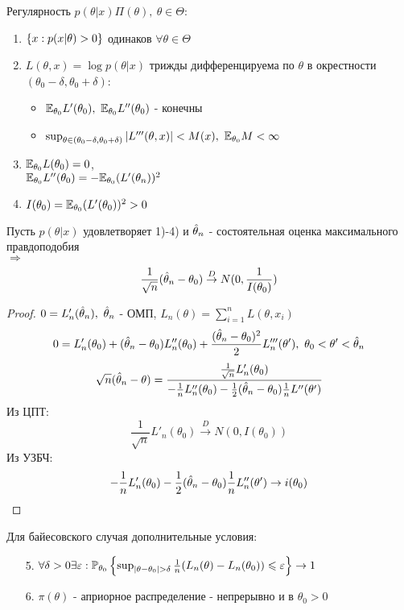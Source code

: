 \begin{definition}
	Регулярность $p(\theta|x)\Pi(\theta), \ \theta \in \Theta$:
	\begin{enumerate}
		\item $\left\{ x: p(x|\theta)>0 \right\}$ одинаков $\forall \theta \in \Theta$
		\item $L(\theta, x) = \log p(\theta|x)$ трижды дифференцируема по $\theta$ в окрестности $(\theta_0-\delta, \theta_0+\delta)$:
		\begin{itemize}
			\item $\set{E}_{\theta_0} L'(\theta_0), \ \set{E}_{\theta_0} L''(\theta_0)$ - конечны
			\item $\sup_{\theta \in (\theta_0-\delta, \theta_0+\delta)} |L'''(\theta, x)| < M(x), \ \mathbb{E}_{\theta_0}M < \infty$ 
		\end{itemize}
		\item $\mathbb{E}_{\theta_0} L(\theta_0) = 0$, \\ $\mathbb{E}_{\theta_0} L''(\theta_0) = - \mathbb{E}_{\theta_0} (L'(\theta_n))^2$
		\item $I(\theta_0) = \mathbb{E}_{\theta_0} (L'(\theta_0))^2 > 0$
	\end{enumerate}
\end{definition}

\begin{theorem}
	Пусть $p(\theta|x)$ удовлетворяет 1)-4) и $\hat{\theta}_n$ - состоятельная оценка максимального правдоподобия \\
	$\Rightarrow$ $$\frac{1}{\sqrt{n}} (\hat{\theta}_n - \theta_0) \overset{D}{\to} N(0, \frac{1}{I(\theta_0)})$$

	\begin{proof}
		$0 = L'_n(\valuation), \ \valuation$ - ОМП, $L_n(\theta) = \sum_{i=1}^nL(\theta, x_i)$ \\
		$$0 = L'_n(\theta_0) + (\valuation-\theta_0)L''_n(\theta_0) + \frac{(\valuation - \theta_0)^2}{2} L'''_n(\theta'), \ \theta_0<\theta'<\valuation$$
		$$ \sqrt{n}(\hat{\theta}_n-\theta) = \frac{\frac{1}{\sqrt{n}}L'_n(\theta_0)}{-\frac{1}{n}L''_n(\theta_0) - \frac{1}{2}(\hat{\theta}_n-\theta_0)\frac{1}{n}L''(\theta')} $$
		Из ЦПТ:
		$$ \frac{1}{\sqrt{n}}L'_n(\theta_0) \overset{D}{\to} N(0, I(\theta_0)) $$
		Из УЗБЧ:
		$$ -\frac{1}{n} L'_n(\theta_0) - \frac{1}{2}(\hat{\theta}_n-\theta_0)\frac{1}{n}L''_n(\theta') \to i(\theta_0) $$
	\end{proof}
\end{theorem}

\begin{definition}
	Для байесовского случая дополнительные условия:
	\begin{enumerate}
		\item[5.] $\forall \delta > 0 \exists \varepsilon: \set{P}_{\theta_0}\braces{\sup_{|\theta-\theta_0|>\delta} \frac{1}{n}(L_n(\theta) - L_n(\theta_0)) \leq \varepsilon} \to 1$
		\item[6.] $\pi(\theta)$ - априорное распределение - непрерывно и в $\theta_0>0$
	\end{enumerate}
\end{definition}

